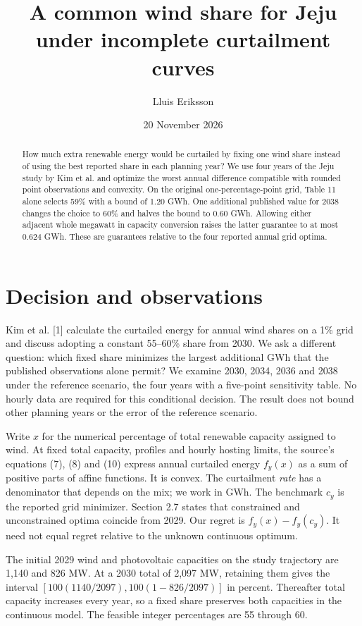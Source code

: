 \documentclass[11pt]{article}
\title{A common wind share for Jeju under incomplete curtailment curves}
\author{Lluis Eriksson}\date{20 November 2026}
\begin{document}
\maketitle
\begin{abstract}
How much extra renewable energy would be curtailed by fixing one wind share instead of using the best reported share in each planning year? We use four years of the Jeju study by Kim et al. and optimize the worst annual difference compatible with rounded point observations and convexity. On the original one-percentage-point grid, Table 11 alone selects 59\% with a bound of 1.20 GWh. One additional published value for 2038 changes the choice to 60\% and halves the bound to 0.60 GWh. Allowing either adjacent whole megawatt in capacity conversion raises the latter guarantee to at most 0.624 GWh. These are guarantees relative to the four reported annual grid optima.
\end{abstract}
\section{Decision and observations}
Kim et al. [1] calculate the curtailed energy for annual wind shares on a 1\% grid and discuss adopting a constant 55--60\% share from 2030. We ask a different question: which fixed share minimizes the largest additional GWh that the published observations alone permit? We examine 2030, 2034, 2036 and 2038 under the reference scenario, the four years with a five-point sensitivity table. No hourly data are required for this conditional decision. The result does not bound other planning years or the error of the reference scenario.

Write $x$ for the numerical percentage of total renewable capacity assigned to wind. At fixed total capacity, profiles and hourly hosting limits, the source's equations (7), (8) and (10) express annual curtailed energy $f_y(x)$ as a sum of positive parts of affine functions. It is convex. The curtailment \emph{rate} has a denominator that depends on the mix; we work in GWh. The benchmark $c_y$ is the reported grid minimizer. Section 2.7 states that constrained and unconstrained optima coincide from 2029. Our regret is $f_y(x)-f_y(c_y)$. It need not equal regret relative to the unknown continuous optimum.

The initial 2029 wind and photovoltaic capacities on the study trajectory are 1,140 and 826 MW. At a 2030 total of 2,097 MW, retaining them gives the interval
$[100(1140/2097),100(1-826/2097)]$ in percent. Thereafter total capacity increases every year, so a fixed share preserves both capacities in the continuous model. The feasible integer percentages are 55 through 60.
\newpage
\end{document}
